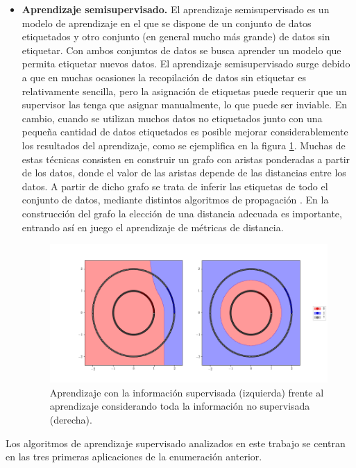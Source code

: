 \begin{itemize}
    \item \textbf{Aprendizaje semisupervisado.} El aprendizaje semisupervisado es un modelo de aprendizaje en el que se dispone de un conjunto de datos etiquetados y otro conjunto (en general mucho más grande) de datos sin etiquetar. Con ambos conjuntos de datos se busca aprender un modelo que permita etiquetar nuevos datos. El aprendizaje semisupervisado surge debido a que en muchas ocasiones la recopilación de datos sin etiquetar es relativamente sencilla, pero la asignación de etiquetas puede requerir que un supervisor las tenga que asignar manualmente, lo que puede ser inviable. En cambio, cuando se utilizan muchos datos no etiquetados junto con una pequeña cantidad de datos etiquetados es posible mejorar considerablemente los resultados del aprendizaje, como se ejemplifica en la figura \ref{fig:ssl}. Muchas de estas técnicas consisten en construir un grafo con aristas ponderadas a partir de los datos, donde el valor de las aristas depende de las distancias entre los datos. A partir de dicho grafo se trata de inferir las etiquetas de todo el conjunto de datos, mediante distintos algoritmos de propagación \cite{ssl1,ssl2}. En la construcción del grafo la elección de una distancia adecuada es importante, entrando así en juego el aprendizaje de métricas de distancia.

    \begin{figure}[h]
    \centering
    \includegraphics[width=\textwidth]{./images/ssl.png}
    \caption{Aprendizaje con la información supervisada (izquierda) frente al aprendizaje considerando toda la información no supervisada (derecha).} \label{fig:ssl}
    \end{figure}

\end{itemize}

Los algoritmos de aprendizaje supervisado analizados en este trabajo se centran en las tres primeras aplicaciones de la enumeración anterior.

